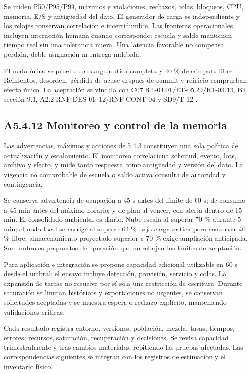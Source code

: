 Se miden P50/P95/P99, máximos y violaciones, rechazos, colas, bloqueos, CPU, memoria, E/S y antigüedad del dato. El generador de carga es independiente y los relojes conservan correlación e incertidumbre. Las fronteras operacionales incluyen interacción humana cuando corresponde; escuela y saldo mantienen tiempo real sin una tolerancia nueva. Una latencia favorable no compensa pérdida, doble asignación ni entrega indebida.

El nodo único se prueba con carga crítica completa y 40 \% de cómputo libre. Reintentos, desorden, pérdida de acuse después de commit y reinicio comprueban efecto único. La aceptación se vincula con C07 RT-09.01/RT-05.29/RT-03.13, BT sección 9.1, A2.2 RNF-DES-01--12/RNF-CONT-04 y SD9/T-12 \parencites[RT-09.01, RT-05.29 y RT-03.13]{pucv-caso07}[sec.~9.1]{pucv-bases-transversales}[anexo A2.2]{synaptix-sd2-anexos}.

\subsection*{A5.4.12 Monitoreo y control de la memoria}

Las advertencias, máximos y acciones de 5.4.3 constituyen una sola política de actualización y escalamiento. El monitoreo correlaciona solicitud, evento, lote, archivo y efecto, y mide tanto respuesta como antigüedad y versión del dato. La vigencia no comprobable de escuela o saldo activa consulta de autoridad y contingencia.

Se conserva advertencia de ocupación a 45 s antes del límite de 60 s; de consumo a 45 min antes del máximo horario; y de plan al vencer, con alerta dentro de 15 min. El consolidado ambiental es diario. Nube escala al superar 70 \% durante 5 min; el nodo local se corrige al superar 60 \% bajo carga crítica para conservar 40 \% libre; almacenamiento proyectado superior a 70 \% exige ampliación anticipada. Son umbrales propuestos de operación que no rebajan los límites de aceptación.

Para aplicación e integración se propone capacidad adicional utilizable en 60 s desde el umbral; el ensayo incluye detección, provisión, servicio y colas. La expansión de tareas no resuelve por sí sola una restricción de escritura. Durante saturación se limitan históricos y exportaciones no urgentes, se conservan solicitudes aceptadas y se muestra espera o rechazo explícito, manteniendo validaciones críticas.

Cada resultado registra entorno, versiones, población, mezcla, tasas, tiempos, errores, recursos, saturación, recuperación y decisiones. Se revisa capacidad trimestralmente y tras cambios materiales, repitiendo las pruebas afectadas. Las correspondencias siguientes se integran con los registros de estimación y el inventario físico.

